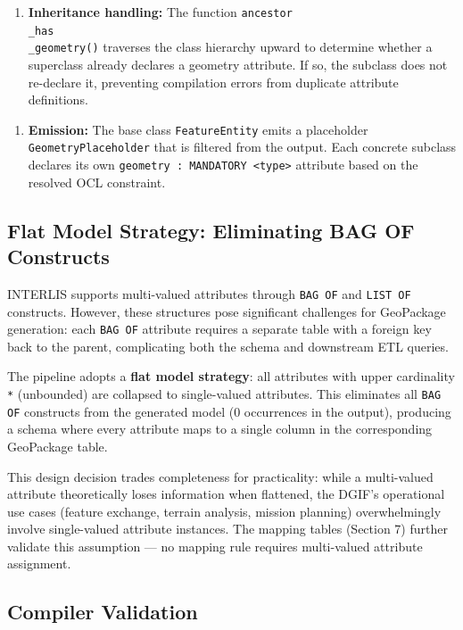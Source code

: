 \documentclass[conference]{IEEEtran}
\begin{document}
\begin{enumerate}[leftmargin=*]
\item \textbf{Inheritance handling:} The function \texttt{ancestor\\_has\\_geometry()} traverses the class hierarchy upward to determine whether a superclass already declares a geometry attribute. If so, the subclass does not re-declare it, preventing compilation errors from duplicate attribute definitions.
\end{enumerate}

\begin{enumerate}[leftmargin=*]
\item \textbf{Emission:} The base class \texttt{FeatureEntity} emits a placeholder \texttt{GeometryPlaceholder} that is filtered from the output. Each concrete subclass declares its own \texttt{geometry : MANDATORY <type>} attribute based on the resolved OCL constraint.
\end{enumerate}

\subsection{Flat Model Strategy: Eliminating BAG OF Constructs}

INTERLIS supports multi-valued attributes through \texttt{BAG OF} and \texttt{LIST OF} constructs. However, these structures pose significant challenges for GeoPackage generation: each \texttt{BAG OF} attribute requires a separate table with a foreign key back to the parent, complicating both the schema and downstream ETL queries.

The pipeline adopts a \textbf{flat model strategy}: all attributes with upper cardinality \texttt{*} (unbounded) are collapsed to single-valued attributes. This eliminates all \texttt{BAG OF} constructs from the generated model (0 occurrences in the output), producing a schema where every attribute maps to a single column in the corresponding GeoPackage table.

This design decision trades completeness for practicality: while a multi-valued attribute theoretically loses information when flattened, the DGIF's operational use cases (feature exchange, terrain analysis, mission planning) overwhelmingly involve single-valued attribute instances. The mapping tables (Section 7) further validate this assumption — no mapping rule requires multi-valued attribute assignment.

\subsection{Compiler Validation}
\end{document}
